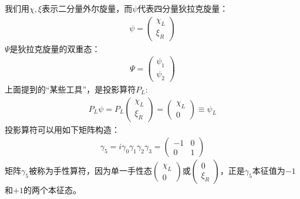 我们用$\chi, \xi$表示二分量外尔旋量，而$\psi$代表四分量狄拉克旋量：
\begin{align}
\psi=\begin{pmatrix}\chi_L\\\xi_R\end{pmatrix}
\label{equ7.98}
\end{align}
$\Psi$是狄拉克旋量的双重态：
\begin{align}
\Psi=\begin{pmatrix}\psi_1\\\psi_2\end{pmatrix}
\label{equ7.99}
\end{align}
上面提到的“某些工具”，是投影算符$P_L$:
\begin{align}
P_L\psi=P_L\begin{pmatrix}\chi_L\\\xi_R\end{pmatrix}=\begin{pmatrix}\chi_L\\0\end{pmatrix}\equiv \psi_L
\label{equ7.100}
\end{align}
投影算符可以用如下矩阵构造：
\begin{align}
\gamma_5=i\gamma_0\gamma_1\gamma_2\gamma_3=\begin{pmatrix}-1 & 0 \\ 0 & 1\end{pmatrix}
\label{equ7.101}
\end{align}
矩阵$\gamma_5$被称为手性算符，因为单一手性态$\begin{pmatrix}\chi_L\\0\end{pmatrix}$或$\begin{pmatrix}0\\\xi_R\end{pmatrix}$，正是$\gamma_5$本征值为$-1$和$+1$的两个本征态。

